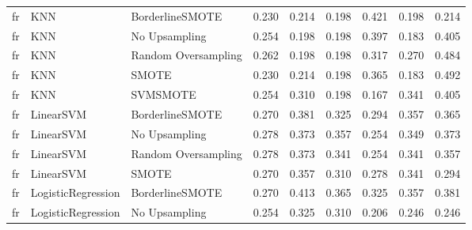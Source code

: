 \begin{tabular}{lllllllll}
      fr &                          KNN &     BorderlineSMOTE &     0.230 &                     0.214 &                 0.198 &                  0.421 &                                   0.198 &     0.214 \\
      fr &                          KNN &       No Upsampling &     0.254 &                     0.198 &                 0.198 &                  0.397 &                                   0.183 &     0.405 \\
      fr &                          KNN & Random Oversampling &     0.262 &                     0.198 &                 0.198 &                  0.317 &                                   0.270 &     0.484 \\
      fr &                          KNN &               SMOTE &     0.230 &                     0.214 &                 0.198 &                  0.365 &                                   0.183 &     0.492 \\
      fr &                          KNN &            SVMSMOTE &     0.254 &                     0.310 &                 0.198 &                  0.167 &                                   0.341 &     0.405 \\
      fr &                    LinearSVM &     BorderlineSMOTE &     0.270 &                     0.381 &                 0.325 &                  0.294 &                                   0.357 &     0.365 \\
      fr &                    LinearSVM &       No Upsampling &     0.278 &                     0.373 &                 0.357 &                  0.254 &                                   0.349 &     0.373 \\
      fr &                    LinearSVM & Random Oversampling &     0.278 &                     0.373 &                 0.341 &                  0.254 &                                   0.341 &     0.357 \\
      fr &                    LinearSVM &               SMOTE &     0.270 &                     0.357 &                 0.310 &                  0.278 &                                   0.341 &     0.294 \\
      fr &           LogisticRegression &     BorderlineSMOTE &     0.270 &                     0.413 &                 0.365 &                  0.325 &                                   0.357 &     0.381 \\
      fr &           LogisticRegression &       No Upsampling &     0.254 &                     0.325 &                 0.310 &                  0.206 &                                   0.246 &     0.246 \\

\end{tabular}
